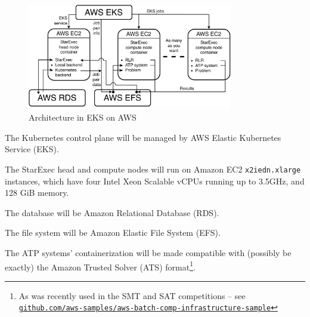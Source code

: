 \documentclass{easychair}
\newenvironment{packed_itemize}{
\vspace*{-0.3em}
\begin{itemize}
\setlength{\partopsep}{0pt}
\setlength{\itemsep}{1pt}
\setlength{\parskip}{0pt}
\setlength{\parsep}{0pt}
}{\end{itemize}}
\newcommand{\dav}[1]{{\color{red}{David: {#1}}}}
\begin{document}
\begin{figure}[htb]
\begin{center}
\includegraphics[width=0.8\textwidth]{ArchitectureAWS}
\caption{Architecture in EKS on AWS}
\label{ArchitectureAWS}
\end{center}
\end{figure}
\begin{packed_itemize}
	
\item The Kubernetes control plane will be managed by AWS Elastic Kubernetes Service (EKS).
\item The StarExec head and compute nodes will run on Amazon EC2 {\tt x2iedn.xlarge} instances,
      which have four Intel Xeon Scalable vCPUs running up to 3.5GHz, and 128 GiB memory.
\item The database will be Amazon Relational Database (RDS).
\item The file system will be Amazon Elastic File System (EFS).
\item The ATP systems' containerization will be made compatible with (possibly be exactly) the 
      Amazon Trusted Solver (ATS) format\footnote{%
      As was recently used in the SMT and SAT competitions -- see \\
      \href{https://github.com/aws-samples/aws-batch-comp-infrastructure-sample}{\tt github.com/aws-samples/aws-batch-comp-infrastructure-sample}}.
\end{packed_itemize}
\end{document}
